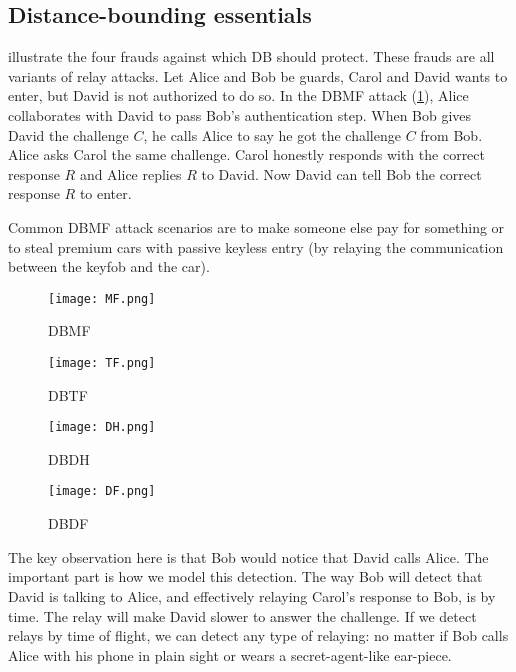 \subsection{Distance-bounding essentials}

 illustrate the four frauds against which \ac{DB} 
should protect.
These frauds are all variants of relay attacks.
Let Alice and Bob be guards, Carol and David wants to enter, but David is not 
authorized to do so.
In the \ac{DBMF} attack (\cref{DBMF}), Alice collaborates with David to pass 
Bob's authentication step.
When Bob gives David the challenge \(C\), he calls Alice to say he got the 
challenge \(C\) from Bob.
Alice asks Carol the same challenge.
Carol honestly responds with the correct response \(R\) and Alice replies \(R\) 
to David.
Now David can tell Bob the correct response \(R\) to enter.

Common \ac{DBMF} attack scenarios are to make someone else pay for something or 
to steal premium cars with passive keyless entry (by relaying the communication 
between the keyfob and the car).

\begin{frame}
  \begin{figure}
    \texttt{[image: MF.png]}
    \caption{\Acl{DBMF}}\label{DBMF}
  \end{figure}
\end{frame}

\begin{frame}
  \begin{figure}
    \texttt{[image: TF.png]}
    \caption{\Acl{DBTF}}\label{DBTF}
  \end{figure}
\end{frame}

\begin{frame}
  \begin{figure}
    \texttt{[image: DH.png]}
    \caption{\Acl{DBDH}}\label{DBDH}
  \end{figure}
\end{frame}

\begin{frame}
  \begin{figure}
    \texttt{[image: DF.png]}
    \caption{\Acl{DBDF}}\label{DBDF}
  \end{figure}
\end{frame}

The key observation here is that Bob would notice that David calls Alice.
The important part is how we model this detection.
The way Bob will detect that David is talking to Alice, and effectively 
relaying Carol's response to Bob, is by time.
The relay will make David slower to answer the challenge.
If we detect relays by time of flight, we can detect any type of relaying: no 
matter if Bob calls Alice with his phone in plain sight or wears a 
secret-agent-like ear-piece.

